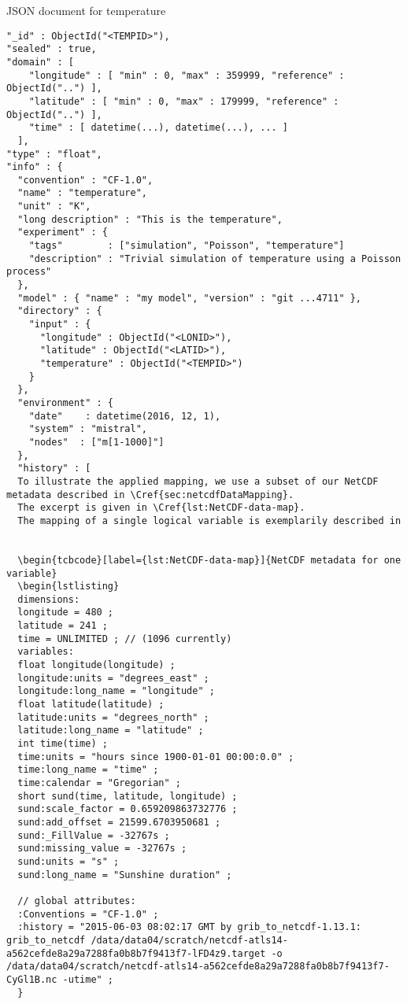 \begin{tcbcode}[label={lst:mongotemperature}]{JSON document for temperature}
\begin{lstlisting}
"_id" : ObjectId("<TEMPID>"),
"sealed" : true,
"domain" : [
    "longitude" : [ "min" : 0, "max" : 359999, "reference" : ObjectId("..") ],
    "latitude" : [ "min" : 0, "max" : 179999, "reference" : ObjectId("..") ],
    "time" : [ datetime(...), datetime(...), ... ]
  ],
"type" : "float",
"info" : {
  "convention" : "CF-1.0",
  "name" : "temperature",
  "unit" : "K",
  "long description" : "This is the temperature",
  "experiment" : {
    "tags"        : ["simulation", "Poisson", "temperature"]
    "description" : "Trivial simulation of temperature using a Poisson process"
  },
  "model" : { "name" : "my model", "version" : "git ...4711" },
  "directory" : {
	"input" : {
	  "longitude" : ObjectId("<LONID>"),
	  "latitude" : ObjectId("<LATID>"),
	  "temperature" : ObjectId("<TEMPID>")
	}
  },
  "environment" : {
    "date"    : datetime(2016, 12, 1),
    "system" : "mistral",
    "nodes"  : ["m[1-1000]"]
  },
  "history" : [
  To illustrate the applied mapping, we use a subset of our NetCDF metadata described in \Cref{sec:netcdfDataMapping}.
  The excerpt is given in \Cref{lst:NetCDF-data-map}.
  The mapping of a single logical variable is exemplarily described in


  \begin{tcbcode}[label={lst:NetCDF-data-map}]{NetCDF metadata for one variable}
  \begin{lstlisting}
  dimensions:
  longitude = 480 ;
  latitude = 241 ;
  time = UNLIMITED ; // (1096 currently)
  variables:
  float longitude(longitude) ;
  longitude:units = "degrees_east" ;
  longitude:long_name = "longitude" ;
  float latitude(latitude) ;
  latitude:units = "degrees_north" ;
  latitude:long_name = "latitude" ;
  int time(time) ;
  time:units = "hours since 1900-01-01 00:00:0.0" ;
  time:long_name = "time" ;
  time:calendar = "Gregorian" ;
  short sund(time, latitude, longitude) ;
  sund:scale_factor = 0.659209863732776 ;
  sund:add_offset = 21599.6703950681 ;
  sund:_FillValue = -32767s ;
  sund:missing_value = -32767s ;
  sund:units = "s" ;
  sund:long_name = "Sunshine duration" ;

  // global attributes:
  :Conventions = "CF-1.0" ;
  :history = "2015-06-03 08:02:17 GMT by grib_to_netcdf-1.13.1: grib_to_netcdf /data/data04/scratch/netcdf-atls14-a562cefde8a29a7288fa0b8b7f9413f7-lFD4z9.target -o /data/data04/scratch/netcdf-atls14-a562cefde8a29a7288fa0b8b7f9413f7-CyGl1B.nc -utime" ;
  }
  \end{lstlisting}
\end{tcbcode}

